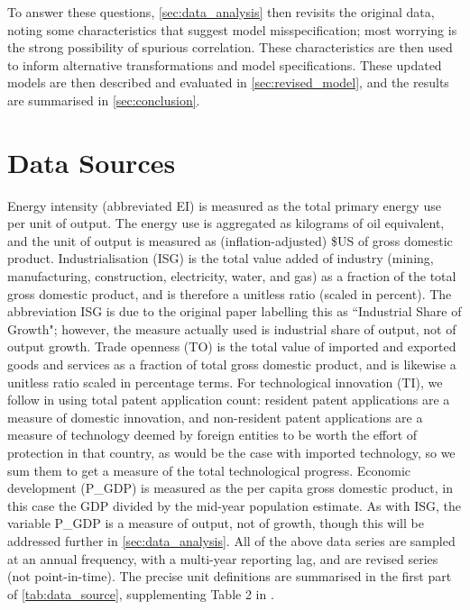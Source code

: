 \documentclass[11pt,a4paper]{article}
\begin{document}
To answer these questions, \cref{sec:data_analysis} then revisits the original data, noting some characteristics that suggest model misspecification; most worrying is the strong possibility of spurious correlation.
These characteristics are then used to inform alternative transformations and model specifications.
These updated models are then described and evaluated in \cref{sec:revised_model}, and the results are summarised in \cref{sec:conclusion}.

\clearpage

\section{Data Sources}\label{sec:data_sources}
Energy intensity (abbreviated EI) is measured as the total primary energy use per unit of output. 
The energy use is aggregated as kilograms of oil equivalent, and the unit of output is measured as (inflation-adjusted) \$US of gross domestic product.
Industrialisation (ISG) is the total value added of industry (mining, manufacturing, construction, electricity, water, and gas) as a fraction of the total gross domestic product, and is therefore a unitless ratio (scaled in percent).
The abbreviation ISG is due to the original paper labelling this as ``Industrial Share of Growth"; however, the measure actually used is industrial share of output, not of output growth.
Trade openness (TO) is the total value of imported and exported goods and services as a fraction of total gross domestic product, and is likewise a unitless ratio scaled in percentage terms.
For technological innovation (TI), we follow \cite{panHowIndustrializationTrade2019} in using total patent application count: resident patent applications are a measure of domestic innovation, and non-resident patent applications are a measure of technology deemed by foreign entities to be worth the effort of protection in that country, as would be the case with imported technology, so we sum them to get a measure of the total technological progress.
Economic development (P\_GDP) is measured as the per capita gross domestic product, in this case the GDP divided by the mid-year population estimate. 
As with ISG, the variable P\_GDP is a measure of output, not of growth, though this will be addressed further in \cref{sec:data_analysis}. 
All of the above data series are sampled at an annual frequency, with a multi-year reporting lag, and are revised series (not point-in-time).
The precise unit definitions are summarised in the first part of \cref{tab:data_source}, supplementing Table 2 in \cite{panHowIndustrializationTrade2019}.
\end{document}
